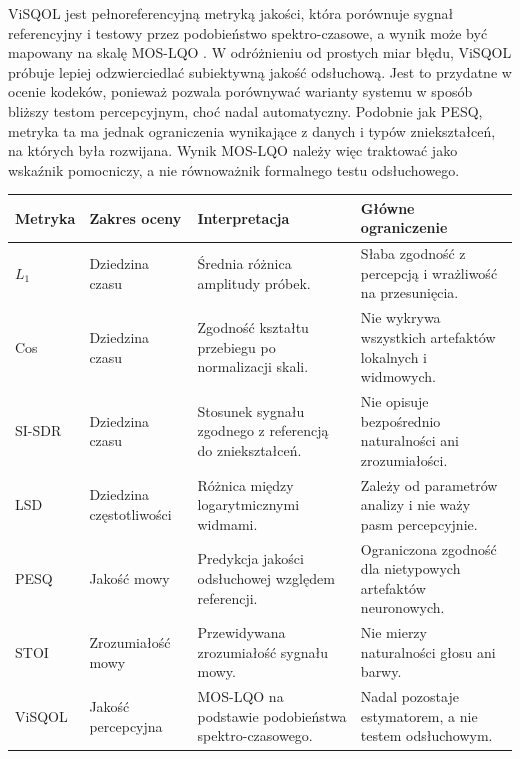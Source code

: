 ViSQOL jest pełnoreferencyjną metryką jakości, która porównuje sygnał referencyjny i testowy przez podobieństwo spektro-czasowe, a wynik może być mapowany na skalę MOS-LQO \cite{Hines2015ViSQOL}. W odróżnieniu od prostych miar błędu, ViSQOL próbuje lepiej odzwierciedlać subiektywną jakość odsłuchową. Jest to przydatne w ocenie kodeków, ponieważ pozwala porównywać warianty systemu w sposób bliższy testom percepcyjnym, choć nadal automatyczny. Podobnie jak PESQ, metryka ta ma jednak ograniczenia wynikające z danych i typów zniekształceń, na których była rozwijana. Wynik MOS-LQO należy więc traktować jako wskaźnik pomocniczy, a nie równoważnik formalnego testu odsłuchowego.

\begin{center}
\footnotesize
\setlength{\tabcolsep}{4pt}
\begin{tabularx}{0.96\textwidth}{>{\raggedright\arraybackslash}p{} >{\raggedright\arraybackslash}p{} >{\raggedright\arraybackslash}X >{\raggedright\arraybackslash}X}
\toprule
\textbf{Metryka} & \textbf{Zakres oceny} & \textbf{Interpretacja} & \textbf{Główne ograniczenie} \\
\midrule
\(L_1\) & Dziedzina czasu & Średnia różnica amplitudy próbek. & Słaba zgodność z percepcją i wrażliwość na przesunięcia. \\
Cos & Dziedzina czasu & Zgodność kształtu przebiegu po normalizacji skali. & Nie wykrywa wszystkich artefaktów lokalnych i widmowych. \\
SI-SDR & Dziedzina czasu & Stosunek sygnału zgodnego z referencją do zniekształceń. & Nie opisuje bezpośrednio naturalności ani zrozumiałości. \\
LSD & Dziedzina częstotliwości & Różnica między logarytmicznymi widmami. & Zależy od parametrów analizy i nie waży pasm percepcyjnie. \\
PESQ & Jakość mowy & Predykcja jakości odsłuchowej względem referencji. & Ograniczona zgodność dla nietypowych artefaktów neuronowych. \\
STOI & Zrozumiałość mowy & Przewidywana zrozumiałość sygnału mowy. & Nie mierzy naturalności głosu ani barwy. \\
ViSQOL & Jakość percepcyjna & MOS-LQO na podstawie podobieństwa spektro-czasowego. & Nadal pozostaje estymatorem, a nie testem odsłuchowym. \\
\bottomrule
\end{tabularx}
\label{tab:metryki-jakosci}
\end{center}

